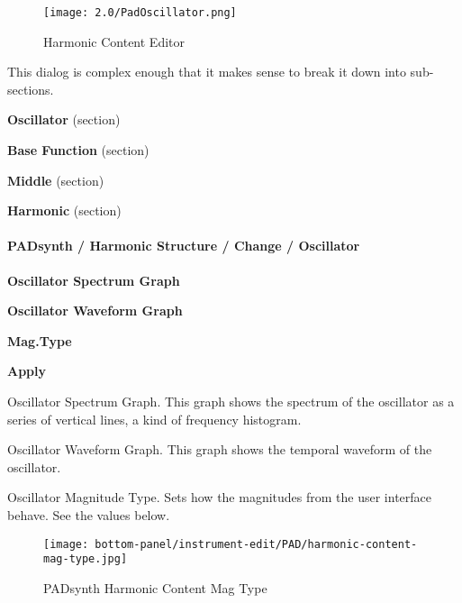 \begin{figure}[H]
   \centering
   \texttt{[image: 2.0/PadOscillator.png]}
   \caption{Harmonic Content Editor}
   \label{fig:padsynth_harmonic_content_editor}
\end{figure}

   This dialog is complex enough that it makes sense to break it down into
   sub-sections.

   \begin{enumber}
      \item \textbf{Oscillator} (section)
      \item \textbf{Base Function} (section)
      \item \textbf{Middle} (section)
      \item \textbf{Harmonic} (section)
   \end{enumber}

\paragraph{PADsynth / Harmonic Structure / Change / Oscillator}
\label{paragraph:padsynth_harmonic_structure_change_oscillator}

   \begin{enumber}
      \item \textbf{Oscillator Spectrum Graph}
      \item \textbf{Oscillator Waveform Graph}
      \item \textbf{Mag.Type}
      \item \textbf{Apply}
   \end{enumber}

   \setcounter{ItemCounter}{0}      %

   Oscillator Spectrum Graph.
   This graph shows the spectrum of the oscillator as a series of vertical
   lines, a kind of frequency histogram.

   Oscillator Waveform Graph.
   This graph shows the temporal waveform  of the oscillator.

   Oscillator Magnitude Type.
   Sets how the magnitudes from the user interface behave.  See the values
   below.

\begin{figure}[H]
   \centering
   \texttt{[image: bottom-panel/instrument-edit/PAD/harmonic-content-mag-type.jpg]}
   \caption{PADsynth Harmonic Content Mag Type}
   \label{fig:padsynth_harmonic_content_mag_type}
\end{figure}


